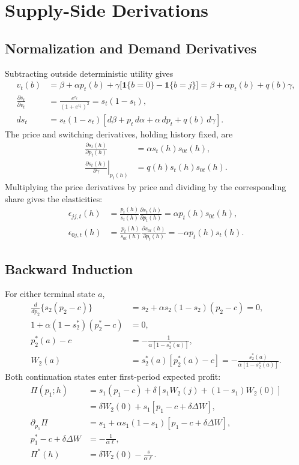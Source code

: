 \documentclass[12pt]{article}
\theoremstyle{definition}
\theoremstyle{remark}
\begin{document}
\newpage
\appendix

\section{Supply-Side Derivations}
\label{app:supply}
\allowdisplaybreaks[1]

\subsection{Normalization and Demand Derivatives}
Subtracting outside deterministic utility gives
\begin{align}
 v_t(b)&=\beta+\alpha p_t(b)
 +\gamma\bigl[\mathbf{1}\{b=0\}-\mathbf{1}\{b=j\}\bigr]
 =\beta+\alpha p_t(b)+q(b)\gamma,\\
 \frac{\partial s_t}{\partial v_t}&=\frac{e^{v_t}}{(1+e^{v_t})^2}
 =s_t(1-s_t),\\
 ds_t&=s_t(1-s_t)[d\beta+p_t\,d\alpha+\alpha\,dp_t+q(b)\,d\gamma].
 \label{eq:supply-total-share}
\end{align}
The price and switching derivatives, holding history fixed, are
\begin{align}
 \frac{\partial s_t(h)}{\partial p_t(h)}&=\alpha s_t(h)s_{0t}(h),\\
 \left.\frac{\partial s_t(h)}{\partial\gamma}\right|_{p_t(h)}
 &=q(h)s_t(h)s_{0t}(h).
\end{align}
Multiplying the price derivatives by price and dividing by the corresponding
share gives the elasticities:
\begin{align}
 \epsilon_{jj,t}(h)&=\frac{p_t(h)}{s_t(h)}
 \frac{\partial s_t(h)}{\partial p_t(h)}
 =\alpha p_t(h)s_{0t}(h),\\
 \epsilon_{0j,t}(h)&=\frac{p_t(h)}{s_{0t}(h)}
 \frac{\partial s_{0t}(h)}{\partial p_t(h)}
 =-\alpha p_t(h)s_t(h).
\end{align}

\subsection{Backward Induction}
For either terminal state $a$,
\begin{align}
 \frac{d}{dp_2}\{s_2(p_2-c)\}
 &=s_2+\alpha s_2(1-s_2)(p_2-c)=0,\\
 1+\alpha(1-s_2^*)(p_2^*-c)&=0,\\
 p_2^*(a)-c&=-\frac{1}{\alpha[1-s_2^*(a)]},\\
 W_2(a)&=s_2^*(a)[p_2^*(a)-c]
 =-\frac{s_2^*(a)}{\alpha[1-s_2^*(a)]}.
\end{align}
Both continuation states enter first-period expected profit:
\begin{align}
 \Pi(p_1;h)&=s_1(p_1-c)+\delta[s_1W_2(j)+(1-s_1)W_2(0)]\\
 &=\delta W_2(0)+s_1[p_1-c+\delta\Delta W],\\
 \partial_{p_1}\Pi
 &=s_1+\alpha s_1(1-s_1)[p_1-c+\delta\Delta W],\\
 p_1^*-c+\delta\Delta W&=-\frac{1}{\alpha\ell},\\
 \Pi^*(h)&=\delta W_2(0)-\frac{s}{\alpha\ell}.
\end{align}
\end{document}
